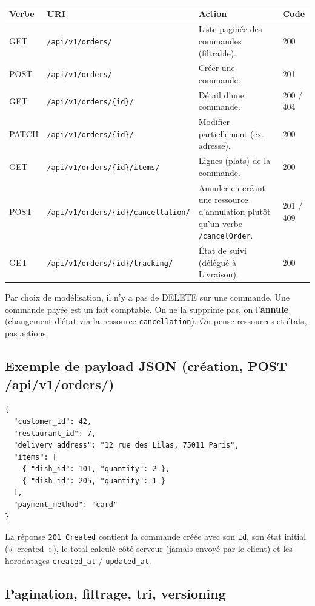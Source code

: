 \documentclass[11pt,a4paper]{article}
\begin{document}
\begin{tabularx}{\textwidth}{@{}p{1.6cm} p{5.2cm} Y p{1.8cm}@{}}
\toprule
\textbf{Verbe} & \textbf{URI} & \textbf{Action} & \textbf{Code} \\
\midrule
GET   & \texttt{/api/v1/orders/} & Liste paginée des commandes (filtrable). & 200 \\[3pt]
POST  & \texttt{/api/v1/orders/} & Créer une commande. & 201 \\[3pt]
GET   & \texttt{/api/v1/orders/\{id\}/} & Détail d'une commande. & 200 / 404 \\[3pt]
PATCH & \texttt{/api/v1/orders/\{id\}/} & Modifier partiellement (ex. adresse). & 200 \\[3pt]
GET   & \texttt{/api/v1/orders/\{id\}/items/} & Lignes (plats) de la commande. & 200 \\[3pt]
POST  & \texttt{/api/v1/orders/\{id\}/cancellation/} & Annuler en créant une ressource d'annulation plutôt qu'un verbe \texttt{/cancelOrder}. & 201 / 409 \\[3pt]
GET   & \texttt{/api/v1/orders/\{id\}/tracking/} & État de suivi (délégué à Livraison). & 200 \\
\bottomrule
\end{tabularx}

\vspace{4pt}
Par choix de modélisation, il n'y a pas de DELETE sur une commande. Une commande payée est un fait comptable. On ne la supprime pas, on l'\textbf{annule} (changement d'état via la ressource \texttt{cancellation}). On pense ressources et états, pas actions.

\subsection{Exemple de payload JSON (création, POST /api/v1/orders/)}

\begin{lstlisting}
{
  "customer_id": 42,
  "restaurant_id": 7,
  "delivery_address": "12 rue des Lilas, 75011 Paris",
  "items": [
    { "dish_id": 101, "quantity": 2 },
    { "dish_id": 205, "quantity": 1 }
  ],
  "payment_method": "card"
}
\end{lstlisting}

La réponse \texttt{201 Created} contient la commande créée avec son \texttt{id}, son état initial («~created~»), le total calculé côté serveur (jamais envoyé par le client) et les horodatages \texttt{created\_at} / \texttt{updated\_at}.

\subsection{Pagination, filtrage, tri, versioning}
\end{document}
